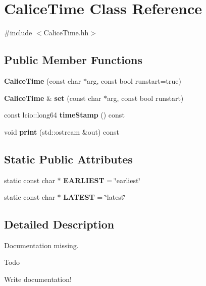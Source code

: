 \section{Calice\-Time Class Reference}
\label{classCaliceTime}


{\ttfamily \#include $<$Calice\-Time.\-hh$>$}

\subsection*{Public Member Functions}
\begin{DoxyCompactItemize}
\item 
{\bfseries Calice\-Time} (const char $\ast$arg, const bool runstart=true)\label{classCaliceTime_a5ffd295d544002a0dc46fb4de7078114}

\item 
{\bf Calice\-Time} \& {\bfseries set} (const char $\ast$arg, const bool runstart)\label{classCaliceTime_aea05ea030999439b0cfd9730d7de2177}

\item 
const lcio\-::long64 {\bf time\-Stamp} () const 
\item 
void {\bfseries print} (std\-::ostream \&out) const \label{classCaliceTime_af18bfed4a0446a82f94e5980d8910fd0}

\end{DoxyCompactItemize}
\subsection*{Static Public Attributes}
\begin{DoxyCompactItemize}
\item 
static const char $\ast$ {\bfseries E\-A\-R\-L\-I\-E\-S\-T} = \char`\"{}earliest\char`\"{}\label{classCaliceTime_a3b7e23eee2c01d54e819944e8a7a0087}

\item 
static const char $\ast$ {\bfseries L\-A\-T\-E\-S\-T} = \char`\"{}latest\char`\"{}\label{classCaliceTime_a3934002803f14e9195005adab0adfcf9}

\end{DoxyCompactItemize}


\subsection{Detailed Description}
Documentation missing. \begin{DoxyRefDesc}{Todo}
\item[{\bf Todo}]Write documentation!\end{DoxyRefDesc}


